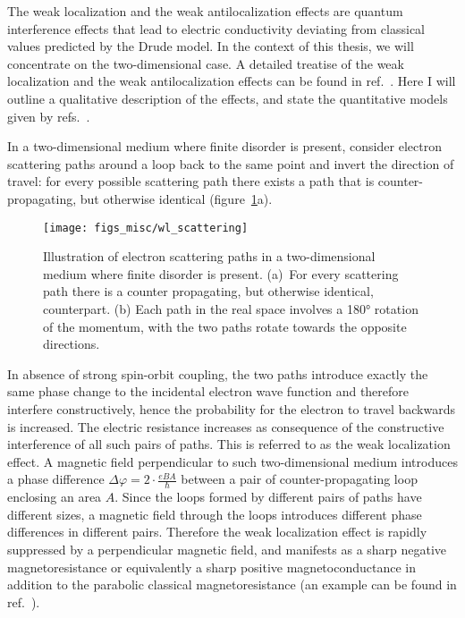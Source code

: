 The weak localization and the weak antilocalization effects are quantum interference effects that lead to electric conductivity deviating from classical values predicted by the Drude model. In the context of this thesis, we will concentrate on the two-dimensional case. A detailed treatise of the weak localization and the weak antilocalization effects can be found in ref.~\cite{bergmann1984}. Here I will outline a qualitative description of the effects, and state the quantitative models given by refs.~\cite{bergmann1984, anderson1979, WL_HLN, WAL_theory, WL_Khmel}.

In a two-dimensional medium where finite disorder is present, consider electron scattering paths around a loop back to the same point and invert the direction of travel: for every possible scattering path there exists a path that is counter-propagating, but otherwise identical (figure~\ref{fig:bg_scattering}a).%
\begin{figure}[ht]%
    \centering%
    \texttt{[image: figs\_misc/wl\_scattering]}%
    \caption[Schematic illustrations of electron scattering paths in two-dimensions.]{\label{fig:bg_scattering}Illustration of electron scattering paths in a two-dimensional medium where finite disorder is present. (a)~For every scattering path there is a counter propagating, but otherwise identical, counterpart. (b) Each path in the real space involves a \ang{180} rotation of the momentum, with the two paths rotate towards the opposite directions.}%
\end{figure}%

In absence of strong spin-orbit coupling, the two paths introduce exactly the same phase change to the incidental electron wave function and therefore interfere constructively, hence the probability for the electron to travel backwards is increased. The electric resistance increases as consequence of the constructive interference of all such pairs of paths. This is referred to as the weak localization effect. A magnetic field perpendicular to such two-dimensional medium introduces a phase difference $\Delta\varphi = 2\cdot\frac{eBA}{\hbar}$ between a pair of counter-propagating loop enclosing an area $A$. Since the loops formed by different pairs of paths have different sizes, a magnetic field through the loops introduces different phase differences in different pairs. Therefore the weak localization effect is rapidly suppressed by a perpendicular magnetic field, and manifests as a sharp negative magnetoresistance or equivalently a sharp positive magnetoconductance in addition to the parabolic classical magnetoresistance (an example can be found in ref.~\cite{bishop1982}).

